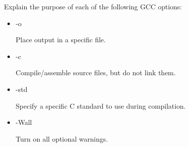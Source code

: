 Explain the purpose of each of the following GCC options:
\begin{itemize}
	\item -o	\hspace{20mm}
		\begin{answer}
		Place output in a specific file.
		\end{answer}
	\item -c	\hspace{20mm}
		\begin{answer}
		Compile/assemble source files, but do not link them.
		\end{answer}
	\item -std	\hspace{17mm}
		\begin{answer}
		Specify a specific C standard to use during compilation.
		\end{answer}
	\item -Wall	\hspace{14mm}
		\begin{answer}
		Turn on all optional warnings.
		\end{answer}
	
\end{itemize}